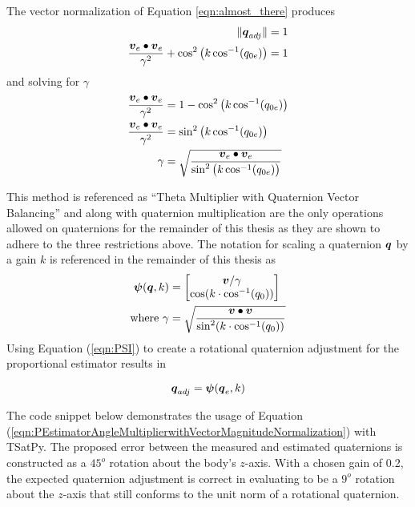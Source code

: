 The vector normalization of Equation \ref{eqn:almost_there} produces
\begin{subequations}
  \begin{align}
    \| \boldsymbol{q}_{adj} \| &= 1 \\
    \frac{\boldsymbol{v}_e \bullet \boldsymbol{v}_e}{\gamma^2} + \cos^2 \big( k \cos^{-1} (q_{0e}) \big) &= 1
  \end{align}
\end{subequations}
and solving for $\gamma$
\begin{subequations}
  \begin{align}
    \frac{\boldsymbol{v}_e \bullet \boldsymbol{v}_e}{\gamma^2}  &= 1 - \cos^2 \big( k \cos^{-1} (q_{0e}) \big)\\
    \frac{\boldsymbol{v}_e \bullet \boldsymbol{v}_e}{\gamma^2}  &= \sin^2 \big( k \cos^{-1} (q_{0e}) \big)\\
    \gamma &= \sqrt{\frac{\boldsymbol{v}_e \bullet \boldsymbol{v}_e}{\sin^2 \big( k \cos^{-1} (q_{0e}) \big)}}
  \end{align}
\end{subequations}

This method is referenced as ``Theta Multiplier with Quaternion Vector Balancing'' and along with quaternion multiplication are the only operations allowed on quaternions for the remainder of this thesis as they are shown to adhere to the three restrictions above.  The notation for scaling a quaternion $\boldsymbol{q}$ by a gain $k$ is referenced in the remainder of this thesis as
\begin{equation}
  \begin{aligned}
    \boldsymbol{\psi}(\boldsymbol{q}, k) &= \begin{bmatrix} \boldsymbol{v} / \gamma \\ \cos ( k \cdot \cos^{-1} (q_0))  \end{bmatrix} \\
    \text{where } \gamma &= \sqrt{\frac{\boldsymbol{v} \bullet \boldsymbol{v}}{\sin^2 ( k \cdot \cos^{-1} (q_0))}} \\
  \end{aligned}
  \label{eqn:PSI}
\end{equation}
Using Equation (\ref{eqn:PSI}) to create a rotational quaternion adjustment for the proportional estimator results in

\begin{equation}
  \boldsymbol{q}_{adj} = \boldsymbol{\psi}(\boldsymbol{q}_e, k)
  \label{eqn:PEstimatorAngleMultiplierwithVectorMagnitudeNormalization}
\end{equation}

The code snippet below demonstrates the usage of Equation (\ref{eqn:PEstimatorAngleMultiplierwithVectorMagnitudeNormalization}) with TSatPy.  The proposed error between the measured and estimated quaternions is constructed as a $45^o$ rotation about the body's $z$-axis.  With a chosen gain of 0.2, the expected quaternion adjustment is correct in evaluating to be a $9^o$ rotation about the $z$-axis that still conforms to the unit norm of a rotational quaternion.


